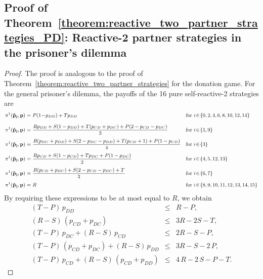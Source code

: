 \documentclass[11pt]{article}
\theoremstyle{plainCl1}
\theoremstyle{plainCl2}
\begin{document}

\subsection{Proof of Theorem~\ref{theorem:reactive_two_partner_strategies_PD}: Reactive-2 partner strategies in the prisoner's dilemma}

\begin{proof}
The proof is analogous to the proof of Theorem~\ref{theorem:reactive_two_partner_strategies} for the donation game. 
For the general prisoner's dilemma, the payoffs of the 16 pure self-reactive-2 strategies are
\begin{equation*} \small
\setlength{\arraycolsep}{0.5mm}
  \begin{array}{lcll} 
  \pi^1(\mathbf{\tilde p_j},\mathbf{p}) &= &\displaystyle  P (1 \!-\! p_{DD}) + T p_{DD} &~~\text{for}~ i\!\in\! \{0, 2, 4, 6, 8, 10, 12, 14\} \\ [0.35cm]
  \pi^1(\mathbf{\tilde p_j},\mathbf{p}) &= &\displaystyle \frac{Rp_{DD} + S(1-p_{DD}) + T(p_{CD} + p_{DC})+P(2-p_{CD} - p_{DC})}{3} &~~\text{for}~ i\!\in\!\{1, 9\} \\ [0.35cm]
\pi^1(\mathbf{\tilde p_j},\mathbf{p}) &= &\displaystyle \frac{R(p_{DC} + p_{DD}) + S(2-p_{DC} - p_{DD}) + T(p_{CD} + 1) + P(1 - p_{CD})}{4} &~~\text{for}~ i\!\in\! \{3\} \\ [0.35cm]
\pi^1(\mathbf{\tilde p_j},\mathbf{p}) &= &\displaystyle \frac{ Rp_{CD} + S(1-p_{CD}) + Tp_{DC}+P(1 - p_{DC})}{2} &~~\text{for}~ i\!\in\! \{4, 5, 12, 13\} \\ [0.35cm]
\pi^1(\mathbf{\tilde p_j},\mathbf{p}) &= &\displaystyle \frac{R(p_{CD} + p_{DC}) + S(2-p_{CD} - p_{DC}) + T}{3} &~~\text{for}~ i\!\in\! \{6, 7\} \\ [0.35cm]
\pi^1(\mathbf{\tilde p_j},\mathbf{p}) &= &\displaystyle R &~~\text{for}~ i\!\in\! \{8, 9, 10, 11, 12, 13, 14, 15\}
\end{array}
\end{equation*}
By requiring these expressions to be at most equal to $R$, we obtain
\begin{equation*}
  \begin{array}{rcl}
    (T - P)\, p_{DD} & \le & R - P, \\ [0.1cm]
    (R - S)\, (p_{CD} + p_{DC}) & \le & 3 R - 2 S - T, \\ [0.1cm]
    (T - P)\, p_{DC}  + (R - S)\, p_{CD} & \le & 2 R - S - P, \\ [0.1cm]
    (T - P)\, (p_{CD} + p_{DC}) + (R - S)\, p_{DD}  & \le & 3 R - S - 2\,P, \\ [0.1cm]
    (T - P)\, p_{CD}  + (R - S)\, (p_{CD} + p_{DD}) & \le & 4\,R - 2\,S - P - T.
\end{array}
\end{equation*}
\end{proof}
\end{document}
